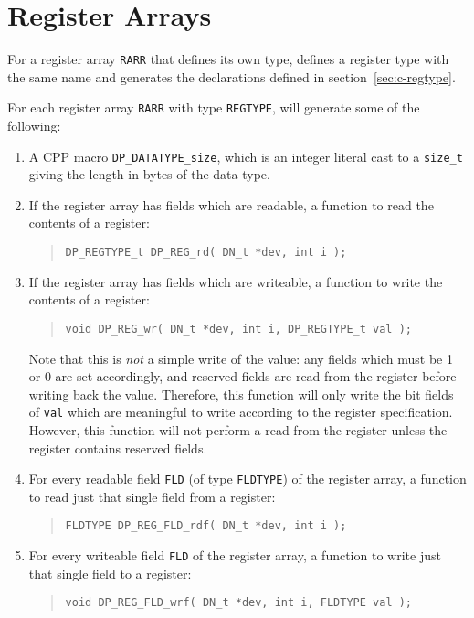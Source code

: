\documentclass[a4paper,11pt,twoside]{report}
\begin{document}
\section{Register Arrays}\label{sec:c-regarray}

For a register array \texttt{RARR} that defines its own type, \Mac defines
a register type with the same name and generates the declarations
defined in section~\ref{sec:c-regtype}. 

For each register array \texttt{RARR} with type \texttt{REGTYPE}, \Mac will
generate some of the following:

\begin{enumerate}

\item A CPP macro \texttt{DP\_DATATYPE\_size}, which is an integer
  literal cast to a \texttt{size\_t} giving the length in bytes of the
  data type. 

\item If the register array has fields which are readable, a function to
  read the contents of a register:
  \begin{quote}
    \texttt{DP\_REGTYPE\_t DP\_REG\_rd( DN\_t *dev, int i );}
  \end{quote}

\item If the register array has fields which are writeable, a function to
  write the contents of a register:
  \begin{quote}
    \texttt{void DP\_REG\_wr( DN\_t *dev, int i, DP\_REGTYPE\_t val );}
  \end{quote}
  Note that this is \emph{not} a simple write of the value: any fields
  which must be 1 or 0 are set accordingly, and reserved fields are
  read from the register before writing back the value.  Therefore,
  this function will only write the bit fields of \texttt{val} which
  are meaningful to write according to the register specification.
  However, this function will not perform a read from the register
  unless the register contains reserved fields. 

\item For every readable field \texttt{FLD} (of type \texttt{FLDTYPE})
  of the register array, a function to read just that single field
  from a register: 
  \begin{quote}
    \texttt{FLDTYPE DP\_REG\_FLD\_rdf( DN\_t *dev, int i );}
  \end{quote}

\item For every writeable field \texttt{FLD} of the register array, a
  function to write just that single field to a register:
  \begin{quote}
    \texttt{void DP\_REG\_FLD\_wrf( DN\_t *dev, int i, \texttt{FLDTYPE} val );}
  \end{quote}
  

\end{enumerate}
\end{document}
